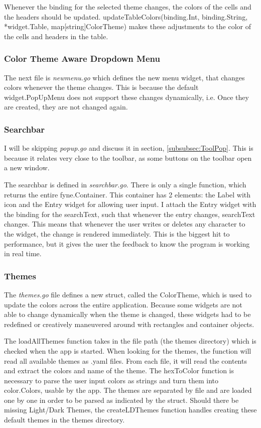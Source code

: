 Whenever the binding for the selected theme changes, the colors of
the cells and the headers should be updated.
updateTableColors(binding.Int, binding.String, *widget.Table,
map[string]ColorTheme) makes these adjustments to the color of the
cells and headers in the table.

\subsubsection{Color Theme Aware Dropdown Menu}

The next file is \textit{newmenu.go} which defines the new menu
widget, that changes colors whenever the theme changes.
This is because the default widget.PopUpMenu does not support these
changes dynamically, i.e. Once they are created, they are not changed
again.

\subsubsection{Searchbar}

I will be skipping \textit{popup.go} and discuss it in
section, \ref{subsubsec:ToolPop}. This is because it relates very
close to the toolbar, as some buttons on the toolbar open a new window.

The searchbar is defined in \textit{searchbar.go}. There is only a
single function, which returns the entire fyne.Container. This
container has 2 elements: the
Label with icon and the Entry widget for allowing user input.
I attach the Entry widget with the binding for the searchText, such
that whenever the entry changes, searchText changes.
This means that whenever the user writes or deletes any character to the widget,
the change is rendered immediately.
This is the biggest hit to
performance, but it gives the user the feedback to know the program
is working in real time.

\subsubsection{Themes}
\label{subsubsec:Themes}

The \textit{themes.go} file defines a new struct, called the
ColorTheme, which is used to update the colors across the entire
application. Because some widgets are not able to change dynamically
when the theme is changed, these widgets had to be redefined or
creatively maneuvered around with rectangles and container objects.

The loadAllThemes function takes in the file path (the themes
directory) which is checked when the app is started. When looking for
the themes, the function will read all available themes as .yaml
files. From each file, it will read the contents and
extract the colors and name of the theme.
The hexToColor function is necessary to
parse the user input colors as strings and turn them into
color.Colors, usable by the app.
The themes are separated by file and are loaded one by one in order
to be parsed as indicated by the struct. Should there be missing
Light/Dark Themes, the createLDThemes function handles creating these
default themes in the themes directory.

